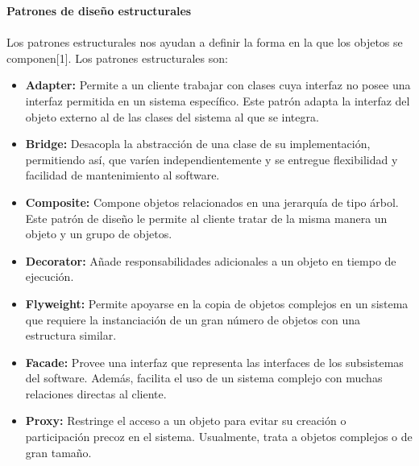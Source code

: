 \documentclass[twoside,twocolumn]{article}
\begin{document}
    \item \textbf{Patrones de diseño estructurales  }
	\\
	\\Los patrones estructurales nos ayudan a definir la forma en la que los objetos se componen[1]. Los patrones estructurales son:
	\begin{itemize}
		\item \textbf{Adapter:}	Permite a un cliente trabajar con clases cuya interfaz no posee una interfaz permitida en un sistema específico. Este patrón adapta la interfaz del objeto externo al de las clases del sistema al que se integra.  
		\item \textbf{Bridge:} Desacopla la abstracción de una clase de su implementación, permitiendo así, que varíen independientemente y se entregue flexibilidad y facilidad de mantenimiento al software.  
		\item \textbf{Composite:} Compone objetos relacionados en una jerarquía de tipo árbol. Este patrón de diseño le permite al cliente tratar de la misma manera un objeto y un grupo de objetos. 
		\item \textbf{Decorator:}	Añade responsabilidades adicionales a un objeto en tiempo de ejecución.  
		\item \textbf{Flyweight:}  Permite apoyarse en la copia de objetos complejos en un sistema que requiere la instanciación de un gran número de objetos con una estructura similar.  
		\item \textbf{Facade:} Provee una interfaz que representa las interfaces de los subsistemas del software. Además, facilita el uso de un sistema complejo con muchas relaciones directas al cliente.  
		\item \textbf{Proxy:} Restringe el acceso a un objeto para evitar su creación o participación precoz en el sistema. Usualmente, trata a objetos complejos o de gran tamaño. 
        \\
        \\
    \end{itemize}
\end{document}
